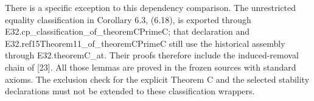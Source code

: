 \documentclass[english,11pt,a4paper]{article}
\begin{document}
There is a specific exception to this dependency comparison. The unrestricted equality classification in Corollary 6.3, (6.18), is exported through {\ttfamily\small E32.\discretionary{\hbox{\ensuremath{\hookrightarrow}}}{}{}cp\_\discretionary{\hbox{\ensuremath{\hookrightarrow}}}{}{}classificati\discretionary{\hbox{\ensuremath{\hookrightarrow}}}{}{}on\_\discretionary{\hbox{\ensuremath{\hookrightarrow}}}{}{}of\_\discretionary{\hbox{\ensuremath{\hookrightarrow}}}{}{}theoremCPrim\discretionary{\hbox{\ensuremath{\hookrightarrow}}}{}{}eC}; that declaration and {\ttfamily\small E32.\discretionary{\hbox{\ensuremath{\hookrightarrow}}}{}{}ref15Theorem\discretionary{\hbox{\ensuremath{\hookrightarrow}}}{}{}11\_\discretionary{\hbox{\ensuremath{\hookrightarrow}}}{}{}of\_\discretionary{\hbox{\ensuremath{\hookrightarrow}}}{}{}theoremCPrim\discretionary{\hbox{\ensuremath{\hookrightarrow}}}{}{}eC} still use the historical assembly through {\ttfamily\small E32.\discretionary{\hbox{\ensuremath{\hookrightarrow}}}{}{}theoremC\_\discretionary{\hbox{\ensuremath{\hookrightarrow}}}{}{}at}. Their proofs therefore include the induced-removal chain of {[}23{]}. All those lemmas are proved in the frozen sources with standard axioms. The exclusion check for the explicit Theorem C and the selected stability declarations must not be extended to these classification wrappers.
\end{document}
